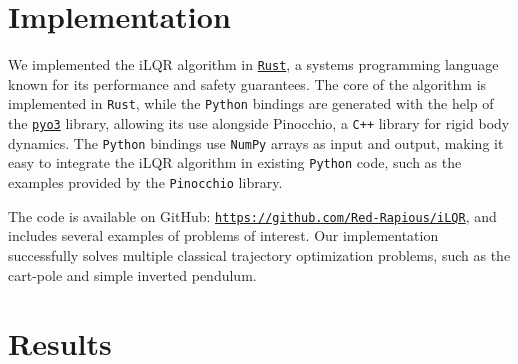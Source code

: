 \documentclass[nodate]{../cs-classes/cs-classes}
\begin{document}
\section{Implementation}
We implemented the iLQR algorithm in \href{https://www.rust-lang.org/}{\texttt{Rust}}, a systems programming language known for its performance and safety guarantees. The core of the algorithm is implemented in \texttt{Rust}, while the \texttt{Python} bindings are generated with the help of the \href{https://pyo3.rs/v0.23.3/}{\texttt{pyo3}} library, allowing its use alongside Pinocchio, a \texttt{C++} library for rigid body dynamics. The \texttt{Python} bindings use \texttt{NumPy} arrays as input and output, making it easy to integrate the iLQR algorithm in existing \texttt{Python} code, such as the examples provided by the \texttt{Pinocchio} library.

The code is available on GitHub: \href{https://github.com/Red-Rapious/iLQR}{\texttt{https://github.com/Red-Rapious/iLQR}}, and includes several examples of problems of interest. Our implementation successfully solves multiple classical trajectory optimization problems, such as the cart-pole and simple inverted pendulum.

\section{Results}
\end{document}
